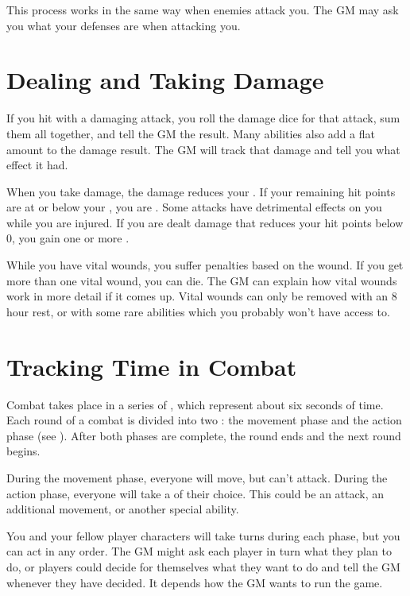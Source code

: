   This process works in the same way when enemies attack you.
  The GM may ask you what your defenses are when attacking you.

\section{Dealing and Taking Damage}
  If you hit with a damaging attack, you roll the damage dice for that attack, sum them all together, and tell the GM the result.
  Many abilities also add a flat amount to the damage result.
  The GM will track that damage and tell you what effect it had.

  When you take damage, the damage reduces your .
  If your remaining hit points are at or below your , you are .
  Some attacks have detrimental effects on you while you are injured.
  If you are dealt damage that reduces your hit points below 0, you gain one or more .

  While you have vital wounds, you suffer penalties based on the wound.
  If you get more than one vital wound, you can die.
  The GM can explain how vital wounds work in more detail if it comes up.
  Vital wounds can only be removed with an 8 hour rest, or with some rare abilities which you probably won't have access to.

\section{Tracking Time in Combat}
  Combat takes place in a series of , which represent about six seconds of time.
  Each round of a combat is divided into two : the movement phase and the action phase (see ).
  After both phases are complete, the round ends and the next round begins.

  During the movement phase, everyone will move, but can't attack.
  During the action phase, everyone will take a  of their choice.
  This could be an attack, an additional movement, or another special ability.

  You and your fellow player characters will take turns during each phase, but you can act in any order.
  The GM might ask each player in turn what they plan to do, or players could decide for themselves what they want to do and tell the GM whenever they have decided.
  It depends how the GM wants to run the game.

